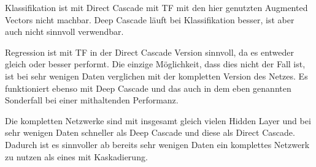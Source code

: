 Klassifikation ist mit Direct Cascade mit TF mit den hier genutzten Augmented Vectors nicht machbar. 
Deep Cascade läuft bei Klassifikation besser, ist aber auch nicht sinnvoll verwendbar. 

Regression ist mit TF in der Direct Cascade Version sinnvoll, da es entweder gleich oder besser performt. Die einzige Möglichkeit, dass dies 
nicht der Fall ist, ist bei sehr wenigen Daten verglichen mit der kompletten Version des Netzes. 
Es funktioniert ebenso mit Deep Cascade und das auch in dem eben genannten Sonderfall bei einer mithaltenden Performanz. 

Die kompletten Netzwerke sind mit insgesamt gleich vielen Hidden Layer und bei sehr wenigen Daten 
schneller als Deep Cascade und diese als Direct Cascade. Dadurch ist es sinnvoller ab bereits sehr wenigen 
Daten ein komplettes Netzwerk zu nutzen als eines mit Kaskadierung. 
